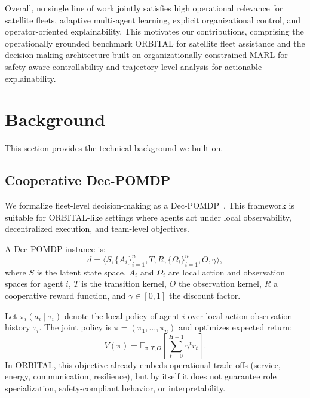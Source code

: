 \documentclass[sigconf]{aamas}
\begin{document}
Overall, no single line of work jointly satisfies high operational relevance for satellite fleets, adaptive multi-agent learning, explicit organizational control, and operator-oriented explainability. This motivates our contributions, comprising the operationally grounded benchmark ORBITAL for satellite fleet assistance and the decision-making architecture built on organizationally constrained MARL for safety-aware controllability and trajectory-level analysis for actionable explainability.

\section{Background}
\label{sec:background}

This section provides the technical background we built on.

\subsection{Cooperative Dec-POMDP}
We formalize fleet-level decision-making as a Dec-POMDP~\cite{Oliehoek2016,Beynier2013}. This framework is suitable for ORBITAL-like settings where agents act under local observability, decentralized execution, and team-level objectives.

\noindent
A Dec-POMDP instance is:
\[
    d = \langle S,\{A_i\}_{i=1}^{n},T,R,\{\Omega_i\}_{i=1}^{n},O,\gamma \rangle,
\]
where $S$ is the latent state space, $A_i$ and $\Omega_i$ are local action and observation spaces for agent $i$, $T$ is the transition kernel, $O$ the observation kernel, $R$ a cooperative reward function, and $\gamma \in [0,1]$ the discount factor.

Let $\pi_i(a_i \mid \tau_i)$ denote the local policy of agent $i$ over local action-observation history $\tau_i$. The joint policy is $\pi = (\pi_1,\ldots,\pi_n)$ and optimizes expected return:
\[
    V(\pi)=\mathbb{E}_{\pi,T,O}\left[\sum_{t=0}^{H-1} \gamma^t r_t \right].
\]
In ORBITAL, this objective already embeds operational trade-offs (service, energy, communication, resilience), but by itself it does not guarantee role specialization, safety-compliant behavior, or interpretability.
\end{document}
